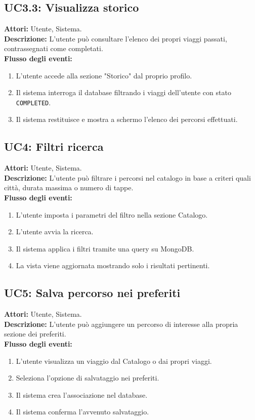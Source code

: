 \subsection*{UC3.3: Visualizza storico}
\textbf{Attori:} Utente, Sistema.\\
\textbf{Descrizione:} L'utente può consultare l'elenco dei propri viaggi passati, contrassegnati come completati.\\
\textbf{Flusso degli eventi:}
\begin{enumerate}
    \item L'utente accede alla sezione "Storico" dal proprio profilo.
    \item Il sistema interroga il database filtrando i viaggi dell'utente con stato \texttt{COMPLETED}.
    \item Il sistema restituisce e mostra a schermo l'elenco dei percorsi effettuati.
\end{enumerate}

\subsection*{UC4: Filtri ricerca}
\textbf{Attori:} Utente, Sistema.\\
\textbf{Descrizione:} L'utente può filtrare i percorsi nel catalogo in base a criteri quali città, durata massima o numero di tappe.\\
\textbf{Flusso degli eventi:}
\begin{enumerate}
    \item L'utente imposta i parametri del filtro nella sezione Catalogo.
    \item L'utente avvia la ricerca.
    \item Il sistema applica i filtri tramite una query su MongoDB.
    \item La vista viene aggiornata mostrando solo i risultati pertinenti.
\end{enumerate}

\subsection*{UC5: Salva percorso nei preferiti}
\textbf{Attori:} Utente, Sistema.\\
\textbf{Descrizione:} L'utente può aggiungere un percorso di interesse alla propria sezione dei preferiti.\\
\textbf{Flusso degli eventi:}
\begin{enumerate}
    \item L'utente visualizza un viaggio dal Catalogo o dai propri viaggi.
    \item Seleziona l'opzione di salvataggio nei preferiti.
    \item Il sistema crea l'associazione nel database.
    \item Il sistema conferma l'avvenuto salvataggio.
\end{enumerate}

